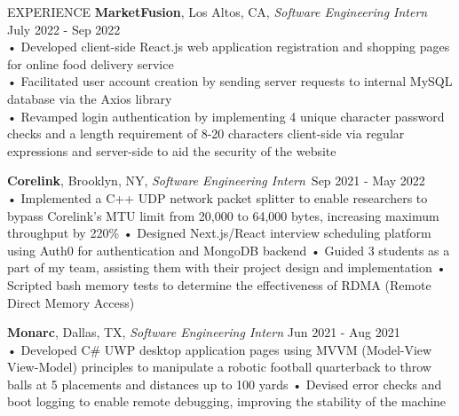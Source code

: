 \documentclass{resume} %
\begin{document}
\begin{rSection}{EXPERIENCE}
\textbf{MarketFusion}, Los Altos, CA, {\emph{Software Engineering Intern}} \hfill July 2022 - Sep 2022 \\
• Developed client-side React.js web application registration and shopping pages for online food delivery service \\
• Facilitated user account creation by sending server requests to internal MySQL database via the Axios library \\
• Revamped login authentication by implementing 4 unique character password checks and a length requirement of 8-20 characters client-side via regular expressions and server-side to aid the security of the website 

\textbf{Corelink}, Brooklyn, NY, {\emph{Software Engineering Intern}}\ \hfill Sep 2021 - May 2022 \\
• Implemented a C++ UDP network packet splitter to enable researchers to bypass Corelink's MTU limit from 20,000 to 64,000 bytes, increasing maximum throughput by 220\% \newline
• Designed Next.js/React interview scheduling platform using Auth0 for authentication and MongoDB backend \newline
• Guided 3 students as a part of my team, assisting them with their project design and implementation \newline
• Scripted bash memory tests to determine the effectiveness of RDMA (Remote Direct Memory Access) 

\textbf{Monarc}, Dallas, TX, {\emph{Software Engineering Intern}} \hfill Jun 2021 - Aug 2021 \\
• Developed C\# UWP desktop application pages using MVVM (Model-View View-Model) principles to manipulate a robotic football quarterback to throw balls at 5 placements and distances up to 100 yards \newline
• Devised error checks and boot logging to enable remote debugging, improving the stability of the machine \smallskip
\end{rSection} 
\end{document}
